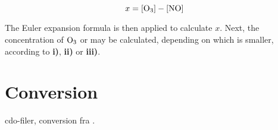 \begin{equation}
    x = [\mathrm{O_3}] - [\mathrm{NO}]
\end{equation}

The Euler expansion formula is then applied to calculate $x$. Next, the concentration of $\mathrm{O_3}$ or  may be calculated, depending on which is smaller, according to \textbf{i)}, \textbf{ii)} or \textbf{iii)}. 

\section{Conversion}

cdo-filer, conversion fra \cite{SovdeManual}. 